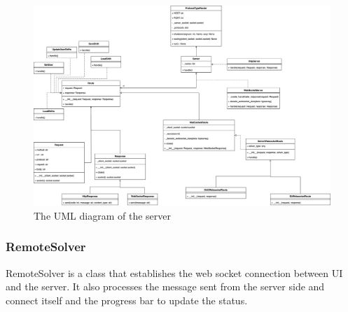 \documentclass[11pt, oneside]{article}   	%
\begin{document}
\begin{figure}[h]
\centering
\includegraphics[width=\textwidth]{serverUML}
\caption{The UML diagram of the server}
\label{serveruml}
\end{figure}


\subsubsection{RemoteSolver}
RemoteSolver is a class that establishes the web socket connection between UI and the server. 
It also processes the message sent from the server side and connect itself and the progress bar to update the status.
\end{document}
